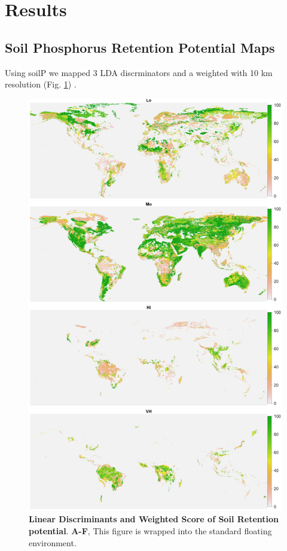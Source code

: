 \documentclass[10pt,letterpaper]{article}
\begin{document}
\newpage

\section*{Results}

\subsection*{Soil Phosphorus Retention Potential Maps}
 Using soilP we mapped  3 LDA discrminators and a weighted  with 10 km resolution (Fig. \ref{fig2}) . 


\begin{figure}[p] %

\includegraphics[width=\textwidth]{fig2.png}

\caption{\color{Gray} \textbf{Linear Discriminants and Weighted Score of Soil Retention potential}. \textbf{A-F}, This figure is wrapped into the standard floating environment.}

\label{fig2} %

\end{figure}
\end{document}
